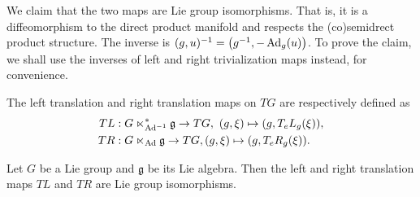 \documentclass[12pt,class=article,crop=false]{standalone}
\begin{document}
We claim that the two maps are Lie group isomorphisms. That is, it is a diffeomorphism to the direct product manifold and respects the (co)semidrect product structure. The inverse is $ (g,u)^{-1} = \left( g^{-1}, - \operatorname{Ad}_{ g}( u) \right)$. To prove the claim, we shall use the inverses of left and right trivialization maps instead, for convenience.
\begin{defn}
The left translation and right translation maps on $ TG$ are respectively defined as
\begin{align*}
	TL&: G\ltimes_{ \operatorname{Ad}^{-1}}^*  \mathfrak{ g} \to TG,\ (g,\xi) \mapsto (g,T_eL_g (\xi)), \\
	TR&: G \ltimes _{\operatorname{Ad}} \mathfrak{g} \to TG, (g, \xi) \mapsto (g, T_eR_g (\xi)) .
\end{align*}
\end{defn}

\begin{prop} 
Let $ G$ be a Lie group and  $ \mathfrak{ g }$ be its Lie algebra. Then the left and right translation maps $ TL$ and  $ TR$ are Lie group isomorphisms.
\end{prop}
\end{document}
